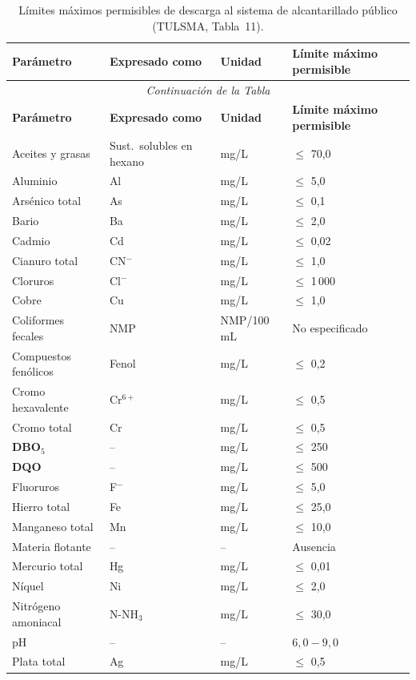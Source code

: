 \documentclass[12pt,a4paper]{article}
\begin{document}
\small
\begin{longtable}{p{4.5cm}p{2.0cm}p{2.0cm}p{3.5cm}}
\caption{L\'imites m\'aximos permisibles de descarga al sistema de alcantarillado p\'ublico (TULSMA, Tabla~11).}\\
\toprule
\textbf{Par\'ametro} & \textbf{Expresado como} & \textbf{Unidad} & \textbf{L\'imite m\'aximo permisible} \\
\midrule
\endfirsthead
\multicolumn{4}{c}{\small\itshape Continuaci\'on de la Tabla}\\
\toprule
\textbf{Par\'ametro} & \textbf{Expresado como} & \textbf{Unidad} & \textbf{L\'imite m\'aximo permisible} \\
\midrule
\endhead
\bottomrule
\endlastfoot
Aceites y grasas & Sust.\ solubles en hexano & mg/L & $\leq$ 70,0 \\
Aluminio & Al & mg/L & $\leq$ 5,0 \\
Ars\'enico total & As & mg/L & $\leq$ 0,1 \\
Bario & Ba & mg/L & $\leq$ 2,0 \\
Cadmio & Cd & mg/L & $\leq$ 0,02 \\
Cianuro total & CN$^-$ & mg/L & $\leq$ 1,0 \\
Cloruros & Cl$^-$ & mg/L & $\leq$ 1\,000 \\
Cobre & Cu & mg/L & $\leq$ 1,0 \\
Coliformes fecales & NMP & NMP/100 mL & No especificado \\
Compuestos fen\'olicos & Fenol & mg/L & $\leq$ 0,2 \\
Cromo hexavalente & Cr$^{6+}$ & mg/L & $\leq$ 0,5 \\
Cromo total & Cr & mg/L & $\leq$ 0,5 \\
\textbf{DBO$_5$} & -- & mg/L & $\leq$ 250 \\
\textbf{DQO} & -- & mg/L & $\leq$ 500 \\
Fluoruros & F$^-$ & mg/L & $\leq$ 5,0 \\
Hierro total & Fe & mg/L & $\leq$ 25,0 \\
Manganeso total & Mn & mg/L & $\leq$ 10,0 \\
Materia flotante & -- & -- & Ausencia \\
Mercurio total & Hg & mg/L & $\leq$ 0,01 \\
N\'iquel & Ni & mg/L & $\leq$ 2,0 \\
Nitr\'ogeno amoniacal & N-NH$_3$ & mg/L & $\leq$ 30,0 \\
pH & -- & -- & $6,0 - 9,0$ \\
Plata total & Ag & mg/L & $\leq$ 0,5 \\

\end{longtable}
\end{document}
